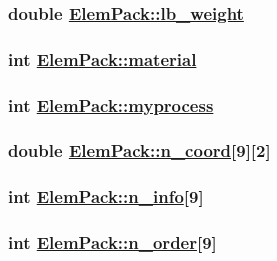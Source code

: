 \hypertarget{structElemPack_o42}{
\subsubsection[lb\_\-weight]{\setlength{\rightskip}{0pt plus 5cm}double \hyperlink{structElemPack_o42}{Elem\-Pack::lb\_\-weight}}}
\label{structElemPack_o42}


\hypertarget{structElemPack_o2}{
\subsubsection[material]{\setlength{\rightskip}{0pt plus 5cm}int \hyperlink{structElemPack_o2}{Elem\-Pack::material}}}
\label{structElemPack_o2}


\hypertarget{structElemPack_o0}{
\subsubsection[myprocess]{\setlength{\rightskip}{0pt plus 5cm}int \hyperlink{structElemPack_o0}{Elem\-Pack::myprocess}}}
\label{structElemPack_o0}


\hypertarget{structElemPack_o26}{
\subsubsection[n\_\-coord]{\setlength{\rightskip}{0pt plus 5cm}double \hyperlink{structElemPack_o26}{Elem\-Pack::n\_\-coord}\mbox{[}9\mbox{]}\mbox{[}2\mbox{]}}}
\label{structElemPack_o26}


\hypertarget{structElemPack_o13}{
\subsubsection[n\_\-info]{\setlength{\rightskip}{0pt plus 5cm}int \hyperlink{structElemPack_o13}{Elem\-Pack::n\_\-info}\mbox{[}9\mbox{]}}}
\label{structElemPack_o13}


\hypertarget{structElemPack_o12}{
\subsubsection[n\_\-order]{\setlength{\rightskip}{0pt plus 5cm}int \hyperlink{structElemPack_o12}{Elem\-Pack::n\_\-order}\mbox{[}9\mbox{]}}}
\label{structElemPack_o12}



